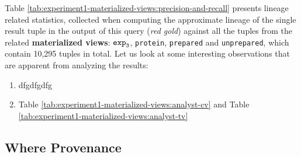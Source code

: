 \begin{experiment-withrun}




Table \ref{tab:experiment1-materialized-views:precision-and-recall} presents lineage related statistics, collected when computing the approximate lineage of the single result tuple in the output of this query (\textit{red gold}) against all the tuples from the related \textbf{materialized views}: $\texttt{exp}\sb\texttt{3}$, \texttt{protein}, \texttt{prepared} and \texttt{unprepared}, which contain 10,295 tuples in total. Let us look at some interesting observations that are apparent from analyzing the results:
\begin{enumerate}
    \item dfgdfgdfg
    \item Table \ref{tab:experiment1-materialized-views:analyst-cv} and Table \ref{tab:experiment1-materialized-views:analyst-tv}
\end{enumerate}




\end{experiment-withrun}


\subsection{Where Provenance}
